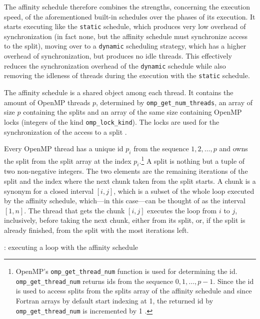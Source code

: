 \documentclass[twoside,11pt]{article}
\begin{document}
The affinity schedule therefore combines the strengths,
concerning the execution speed, of the aforementioned
built-in schedules over the phases of its execution.
It starts executing like the \texttt{static} schedule,
which produces very low overhead of synchronization (in
fact none, but the affinity schedule must synchronize
access to the split), moving over to a \texttt{dynamic}
scheduling strategy,
which has a higher overhead of synchronization, but
produces no idle threads.
This effectively reduces the synchronization overhead of
the \texttt{dynamic} schedule while also removing the
idleness of threads during the execution with the
\texttt{static} schedule.

The affinity schedule is a shared object among each thread.
It contains the amount of OpenMP threads $p$, determined
by \texttt{omp\_get\_num\_threads}, an array of size $p$
containing the splits and an array of the same size
containing OpenMP locks (integers of the kind
\texttt{omp\_lock\_kind}).
The locks are used for the synchronization of the access
to a split \citep[see][Chapter 3]{omp}.

Every OpenMP thread has a unique id $p_i$ from the sequence
$1,2,\dots,p$ and owns the split from the split array at
the index $p_i$.\footnote{%
  OpenMP's \texttt{omp\_get\_thread\_num} function is used
  for determining the id.
  \texttt{omp\_get\_thread\_num} returns ids from the
  sequence $0,1,\dots,p-1$. Since the id is used to access
  splits from the splits array of the affinity schedule and
  since Fortran arrays by default start indexing at 1, the
  returned id by \texttt{omp\_get\_thread\_num} is
  incremented by 1 \citep[see][Chapter 3]{omp}.}
A split is nothing but a tuple of two non-negative
integers. The two elements are the remaining iterations of
the split and the index where the next chunk taken from the
split starts.
A chunk is a synonym for a closed interval $[i, j]$, which
is a subset of the whole loop executed by the affinity
schedule, which---in this case---can be thought of as the
interval $[1, n]$.
The thread that gets the chunk $[i, j]$ executes the loop
from $i$ to $j$, inclusively, before taking the next chunk,
either from its split, or, if the split is already
finished, from the split with the most iterations left.

\begin{algorithm}
  \caption{: executing a loop with the affinity schedule}
  \label{alg:main}

  \begin{algorithmic}[1]
      \ELSE
      \ENDIF
    \ENDWHILE
  \end{algorithmic}
\end{algorithm}
\end{document}
